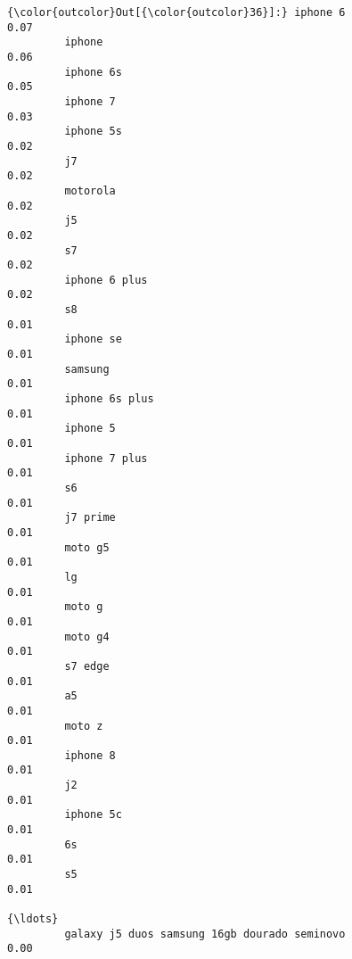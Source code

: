 \documentclass[11pt]{article}
\begin{document}
\begin{Verbatim}[commandchars=\\\{\}]
{\color{outcolor}Out[{\color{outcolor}36}]:} iphone 6                                                       0.07
         iphone                                                         0.06
         iphone 6s                                                      0.05
         iphone 7                                                       0.03
         iphone 5s                                                      0.02
         j7                                                             0.02
         motorola                                                       0.02
         j5                                                             0.02
         s7                                                             0.02
         iphone 6 plus                                                  0.02
         s8                                                             0.01
         iphone se                                                      0.01
         samsung                                                        0.01
         iphone 6s plus                                                 0.01
         iphone 5                                                       0.01
         iphone 7 plus                                                  0.01
         s6                                                             0.01
         j7 prime                                                       0.01
         moto g5                                                        0.01
         lg                                                             0.01
         moto g                                                         0.01
         moto g4                                                        0.01
         s7 edge                                                        0.01
         a5                                                             0.01
         moto z                                                         0.01
         iphone 8                                                       0.01
         j2                                                             0.01
         iphone 5c                                                      0.01
         6s                                                             0.01
         s5                                                             0.01
                                                                {\ldots}         
         galaxy j5 duos samsung 16gb dourado seminovo                   0.00

\end{Verbatim}
\end{document}
